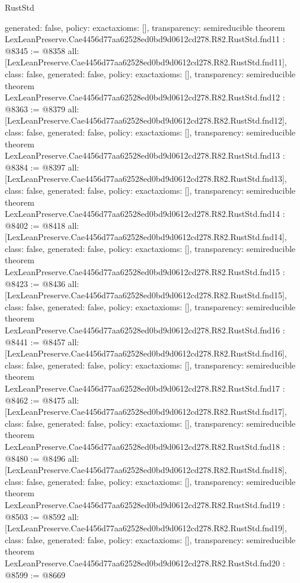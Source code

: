 \begin{lexlean}{RustStd}
\begin{coremodule}
{  generated: false,
  policy: exact{axioms: []},
  transparency: semireducible
}
theorem LexLeanPreserve.Cae4456d77aa62528ed0bd9d0612cd278.R82.RustStd.fnd11 : @8345 := @8358 {
  all: [LexLeanPreserve.Cae4456d77aa62528ed0bd9d0612cd278.R82.RustStd.fnd11],
  class: false,
  generated: false,
  policy: exact{axioms: []},
  transparency: semireducible
}
theorem LexLeanPreserve.Cae4456d77aa62528ed0bd9d0612cd278.R82.RustStd.fnd12 : @8363 := @8379 {
  all: [LexLeanPreserve.Cae4456d77aa62528ed0bd9d0612cd278.R82.RustStd.fnd12],
  class: false,
  generated: false,
  policy: exact{axioms: []},
  transparency: semireducible
}
theorem LexLeanPreserve.Cae4456d77aa62528ed0bd9d0612cd278.R82.RustStd.fnd13 : @8384 := @8397 {
  all: [LexLeanPreserve.Cae4456d77aa62528ed0bd9d0612cd278.R82.RustStd.fnd13],
  class: false,
  generated: false,
  policy: exact{axioms: []},
  transparency: semireducible
}
theorem LexLeanPreserve.Cae4456d77aa62528ed0bd9d0612cd278.R82.RustStd.fnd14 : @8402 := @8418 {
  all: [LexLeanPreserve.Cae4456d77aa62528ed0bd9d0612cd278.R82.RustStd.fnd14],
  class: false,
  generated: false,
  policy: exact{axioms: []},
  transparency: semireducible
}
theorem LexLeanPreserve.Cae4456d77aa62528ed0bd9d0612cd278.R82.RustStd.fnd15 : @8423 := @8436 {
  all: [LexLeanPreserve.Cae4456d77aa62528ed0bd9d0612cd278.R82.RustStd.fnd15],
  class: false,
  generated: false,
  policy: exact{axioms: []},
  transparency: semireducible
}
theorem LexLeanPreserve.Cae4456d77aa62528ed0bd9d0612cd278.R82.RustStd.fnd16 : @8441 := @8457 {
  all: [LexLeanPreserve.Cae4456d77aa62528ed0bd9d0612cd278.R82.RustStd.fnd16],
  class: false,
  generated: false,
  policy: exact{axioms: []},
  transparency: semireducible
}
theorem LexLeanPreserve.Cae4456d77aa62528ed0bd9d0612cd278.R82.RustStd.fnd17 : @8462 := @8475 {
  all: [LexLeanPreserve.Cae4456d77aa62528ed0bd9d0612cd278.R82.RustStd.fnd17],
  class: false,
  generated: false,
  policy: exact{axioms: []},
  transparency: semireducible
}
theorem LexLeanPreserve.Cae4456d77aa62528ed0bd9d0612cd278.R82.RustStd.fnd18 : @8480 := @8496 {
  all: [LexLeanPreserve.Cae4456d77aa62528ed0bd9d0612cd278.R82.RustStd.fnd18],
  class: false,
  generated: false,
  policy: exact{axioms: []},
  transparency: semireducible
}
theorem LexLeanPreserve.Cae4456d77aa62528ed0bd9d0612cd278.R82.RustStd.fnd19 : @8503 := @8592 {
  all: [LexLeanPreserve.Cae4456d77aa62528ed0bd9d0612cd278.R82.RustStd.fnd19],
  class: false,
  generated: false,
  policy: exact{axioms: []},
  transparency: semireducible
}
theorem LexLeanPreserve.Cae4456d77aa62528ed0bd9d0612cd278.R82.RustStd.fnd20 : @8599 := @8669 {
}
\end{coremodule}
\end{lexlean}
